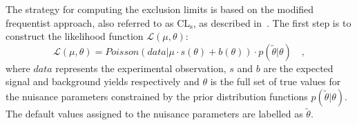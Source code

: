 The strategy for computing the exclusion limits is based on the modified frequentist approach, also referred to as $\mathrm{CL_s}$, as described in~\cite{CMS-NOTE-2011-005}. The first step is to construct the likelihood function $\mathcal{L}(\mu,\theta)$:
\begin{equation}
\mathcal{L}(\mu,\theta) = Poisson(data|\mu\cdot s(\theta) + b(\theta))\cdot p(\tilde{\theta}|\theta) \quad,
\end{equation}
where $data$ represents the experimental observation, $s$ and $b$ are the expected signal and background yields respectively and $\theta$ is the full set of true values for the nuisance parameters constrained by the prior distribution functions $p(\tilde{\theta}|\theta)$. The default values assigned to the nuisance parameters are labelled as $\tilde{\theta}$.

